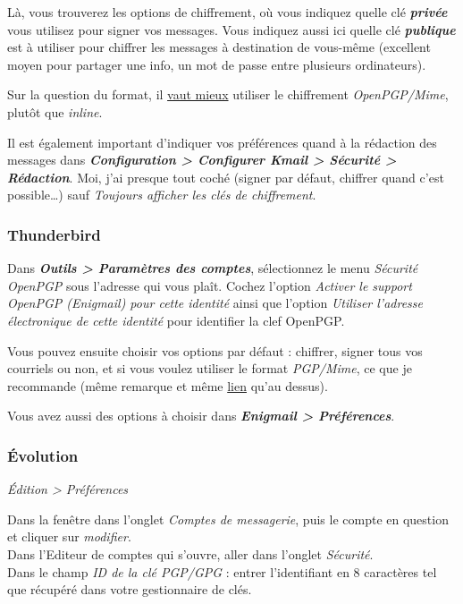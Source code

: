 Là, vous trouverez les options de chiffrement, où vous indiquez quelle
clé \textbf{\emph{privée}} vous utilisez pour signer vos messages. Vous
indiquez aussi ici quelle clé \textbf{\emph{publique}} est à utiliser
pour chiffrer les messages à destination de vous-même (excellent moyen
pour partager une info, un mot de passe entre plusieurs ordinateurs).

Sur la question du format, il
\href{http://blog.chown.me/choisir-pgp-mime-ou-pgp-inline.html}{vaut
mieux} utiliser le chiffrement \emph{OpenPGP/Mime}, plutôt que
\emph{inline}.

Il est également important d'indiquer vos préférences quand à la
rédaction des messages dans \textbf{\emph{Configuration \textgreater{}
Configurer Kmail \textgreater{} Sécurité \textgreater{} Rédaction}}.
Moi, j'ai presque tout coché (signer par défaut, chiffrer quand c'est
possible\ldots{}) sauf \emph{Toujours afficher les clés de chiffrement}.

\subsubsection{Thunderbird}\label{thunderbird}

Dans \textbf{\emph{Outils \textgreater{} Paramètres des comptes}},
sélectionnez le menu \emph{Sécurité OpenPGP} sous l'adresse qui vous
plaît. Cochez l'option \emph{Activer le support OpenPGP (Enigmail) pour
cette identité} ainsi que l'option \emph{Utiliser l'adresse électronique
de cette identité} pour identifier la clef OpenPGP.

Vous pouvez ensuite choisir vos options par défaut : chiffrer, signer
tous vos courriels ou non, et si vous voulez utiliser le format
\emph{PGP/Mime}, ce que je recommande (même remarque et même
\href{http://blog.chown.me/choisir-pgp-mime-ou-pgp-inline.html}{lien}
qu'au dessus).

Vous avez aussi des options à choisir dans \textbf{\emph{Enigmail
\textgreater{} Préférences}}.

\subsubsection{Évolution}\label{uxe9volution}

\emph{Édition \textgreater{} Préférences}

Dans la fenêtre dans l'onglet \emph{Comptes de messagerie}, puis le
compte en question et cliquer sur \emph{modifier}.\\Dans l'Editeur de
comptes qui s'ouvre, aller dans l'onglet \emph{Sécurité}.\\Dans le champ
\emph{ID de la clé PGP/GPG} : entrer l'identifiant en 8 caractères tel
que récupéré dans votre gestionnaire de clés.


